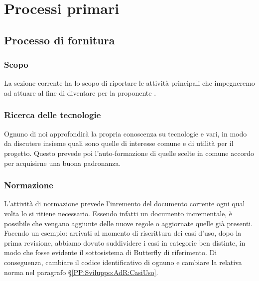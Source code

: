 \section{Processi primari}\label{ProcessiPrimari}

    \subsection{Processo di fornitura}\label{PP:Fornitura}	%

        \subsubsection{Scopo}\label{PP:Fornitura:Scopo}
		La sezione corrente ha lo scopo di riportare le attività principali che impegneremo ad attuare al fine di
		diventare  per la proponente \II.

		\subsubsection{Ricerca delle tecnologie}
		Ognuno di noi approfondirà la propria conoscenza su tecnologie e  vari, in modo da discutere insieme quali sono
		quelle di interesse comune e di utilità per il progetto. Questo prevede poi l'auto-formazione di quelle scelte in comune accordo
		per acquisirne una buona padronanza.

		\subsubsection{Normazione}\label{Normazione} %
		L'attività di normazione prevede l'inremento del documento corrente ogni qual volta lo si ritiene necessario.
		Essendo infatti un documento incrementale, è possibile che vengano aggiunte delle nuove regole o aggiornate quelle già presenti.
		Facendo un esempio: arrivati al momento di riscrittura dei casi d'uso, dopo la prima revisione, abbiamo dovuto suddividere i casi in categorie ben distinte, in modo che fosse evidente il sottosistema di Butterfly di riferimento.
		Di conseguenza, cambiare il codice identificativo di ognuno e cambiare la relativa norma nel paragrafo \S\ref{PP:Sviluppo:AdR:CasiUso}.

